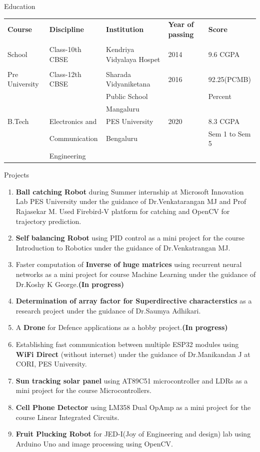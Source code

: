 \documentclass{resume} %
\begin{document}
\begin{rSection}{Education}
\centering
\begin{tabular}{|l|l|l|l|l|}
\hline
{\bf Course} & {\bf Discipline} & {\bf Institution} & {\bf Year of passing} & {\bf Score} \\
&&&&\\
\hline
 School & Class-10th CBSE & Kendriya Vidyalaya Hospet & 2014 & 9.6 CGPA\\
 &&&&\\
 \hline
 Pre University & Class-12th CBSE & Sharada Vidyaniketana & 2016 & 92.25(PCMB)\\
  & & Public School & &Percent\\
  && Mangaluru &&\\
  \hline
  B.Tech & Electronics and & PES University & 2020 & 8.3 CGPA\\
  &Communication& Bengaluru &&Sem 1 to Sem 5\\
  & Engineering&&&\\
  \hline
\end{tabular}
\end{rSection}

\pagebreak

\begin{rSection}{Projects}
\begin{enumerate}
    \item {\bf Ball catching Robot} during Summer internship at Microsoft Innovation Lab PES University under the guidance of Dr.Venkatarangan MJ and Prof Rajasekar M. Used Firebird-V platform for catching and OpenCV for trajectory prediction.
    \item {\bf Self balancing Robot} using PID control as a mini project for the course Introduction to Robotics under the guidance of Dr.Venkatrangan MJ.
    \item Faster computation of {\bf Inverse of huge matrices} using recurrent neural networks as a mini project for course Machine Learning under the guidance of Dr.Koshy K George.{\bf (In progress)}
    \item {\bf Determination of array factor for Superdirective characterstics} as a research project under the guidance of Dr.Saumya Adhikari.
    \item A {\bf Drone} for Defence applications as a hobby project.{\bf (In progress)}
    \item Establishing fast communication between multiple ESP32 modules using {\bf WiFi Direct} (without internet)  under the guidance of Dr.Manikandan J at CORI, PES University.
    \item {\bf Sun tracking solar panel} using AT89C51 microcontroller and LDRs as a mini project for the course Microcontrollers.
    \item {\bf Cell Phone Detector} using LM358 Dual OpAmp as a mini project for the course Linear Integrated Circuits.
    \item {\bf Fruit Plucking Robot} for JED-I(Joy of Engineering and design) lab using Arduino Uno and image processing using OpenCV.
\end{enumerate}
\end{rSection}
\end{document}
